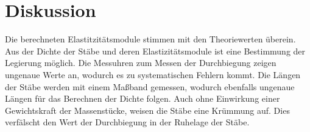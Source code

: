 \section{Diskussion}
\label{sec:Diskussion}
Die berechneten Elastitzitätsmodule stimmen mit den Theoriewerten überein. Aus der Dichte der Stäbe und deren
Elastizitätsmodule ist eine Bestimmung der Legierung möglich. Die Messuhren zum Messen der Durchbiegung
zeigen ungenaue Werte an, wodurch es zu systematischen Fehlern kommt. Die Längen der Stäbe werden mit
einem Maßband gemessen, wodurch ebenfalls ungenaue Längen für das Berechnen der Dichte folgen. Auch
ohne Einwirkung einer Gewichtskraft der Massenstücke, weisen die Stäbe eine Krümmung auf. Dies
verfälscht den Wert der Durchbiegung in der Ruhelage der Stäbe.
